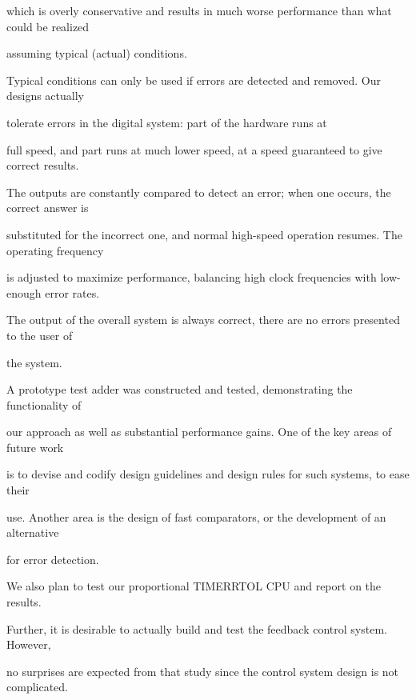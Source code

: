 \documentclass[12pt,dvips]{article}
\begin{document}
which is overly conservative and results in much worse performance than what could be realized

assuming typical (actual) conditions.

Typical conditions can only be used if errors are detected and removed. Our designs actually

tolerate errors in the digital system: part of the hardware runs at

full speed, and part runs at much lower speed, at a speed guaranteed to give correct results.

The outputs are constantly compared to detect an error; when one occurs, the correct answer is

substituted for the incorrect one, and normal high-speed operation resumes. The operating frequency

is adjusted to maximize performance, balancing high clock frequencies with low-enough error rates.

The output of the overall system is always correct, there are no errors presented to the user of

the system.



A prototype test adder was constructed and tested, demonstrating the functionality of

our approach as well as substantial performance gains. One of the key areas of future work

is to devise and codify design guidelines and design rules for such systems, to ease their

use. Another area is the design of fast comparators, or the development of an alternative

for error detection.



We also plan to test our proportional TIMERRTOL CPU and report on the results.

Further, it is desirable to actually build and test the feedback control system. However,

no surprises are expected from that study since the control system design is not complicated.



\begin{spacing}{1.0}

{\small 





}

\end{spacing}
\end{document}

